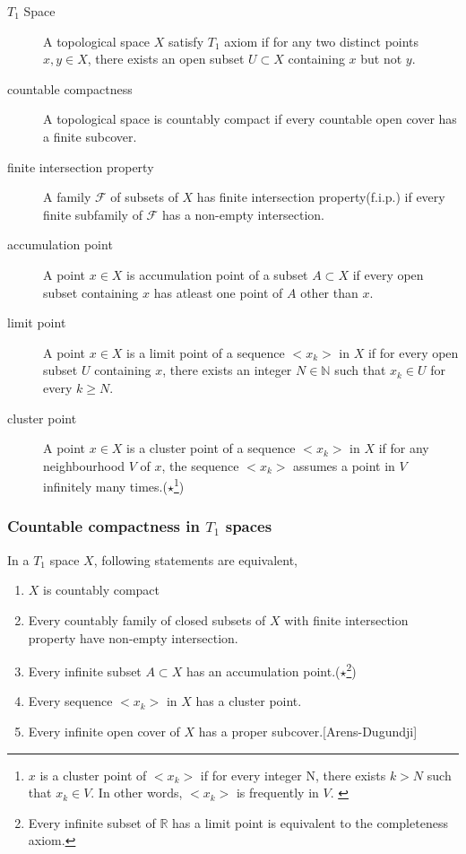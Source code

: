 \begin{description}
	\item[$T_1$ Space] A topological space $X$ satisfy $T_1$ axiom if for any two distinct points $x,y \in X$, there exists an open subset $U \subset X$ containing $x$ but not $y$.
		\cite[7.1.2]{joshi}
	\item[countable compactness] A topological space is countably compact if every countable open cover has a finite subcover.
		\cite[11.1.1]{joshi}
	\item[finite intersection property] A family $\mathcal{F}$ of subsets of $X$ has finite intersection property(f.i.p.) if every finite subfamily of $\mathcal{F}$ has a non-empty intersection.
		\cite[10.2.6]{joshi}
	\item[accumulation point] A point $x \in X$ is accumulation point of a subset $A \subset X$ if every open subset containing $x$ has atleast one point of $A$ other than $x$.
		\cite[5.2.7]{joshi}
	\item[limit point] A point $x \in X$ is a limit point of a sequence $< x_k >$ in $X$ if for every open subset $U$ containing $x$, there exists an integer $N \in \mathbb{N}$ such that $x_k \in U$ for every $k \ge N$.
		\cite[4.1.7]{joshi}
	\item[cluster point] A point $x \in X$ is a cluster point of a sequence $< x_k >$ in $X$ if for any neighbourhood $V$ of $x$, the sequence $< x_k >$ assumes a point in $V$ infinitely many times.($\star$\footnote{$x$ is a cluster point of $< x_k >$ if for every integer N, there exists $k > N$ such that $x_k \in V$.
		In other words, $< x_k >$ is frequently in $V$.
		\cite[10.1.9]{joshi}})
\end{description}

\subsubsection{Countable compactness in $T_1$ spaces}
\begin{theorem}
	In a $T_1$ space $X$, following statements are equivalent,
\begin{enumerate}
	\item $X$ is countably compact
	\item Every countably family of closed subsets of $X$ with finite intersection property have non-empty intersection.
	\item Every infinite subset $A \subset X$ has an accumulation point.($\star$\footnote{Every infinite subset of $\mathbb{R}$ has a limit point is equivalent to the completeness axiom.})
	\item Every sequence $< x_k >$ in $X$ has a cluster point.
	\item Every infinite open cover of $X$ has a proper subcover.[Arens-Dugundji]
\end{enumerate}
\end{theorem}

